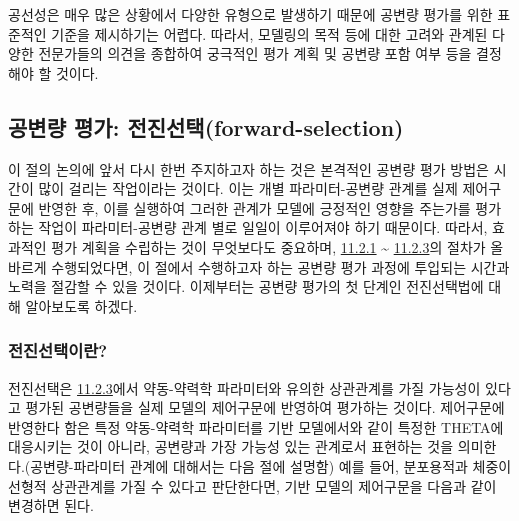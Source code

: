 \documentclass[
  11pt,
  krantz2,
  a4paper]{krantz}
\theoremstyle{definition}
\theoremstyle{definition}
\theoremstyle{definition}
\theoremstyle{remark}
\begin{document}
공선성은 매우 많은 상황에서 다양한 유형으로 발생하기 때문에 공변량 평가를 위한 표준적인 기준을 제시하기는 어렵다. 따라서, 모델링의 목적 등에 대한 고려와 관계된 다양한 전문가들의 의견을 종합하여 궁극적인 평가 계획 및 공변량 포함 여부 등을 결정해야 할 것이다.

\hypertarget{uxacf5uxbcc0uxb7c9-uxd3c9uxac00-uxc804uxc9c4uxc120uxd0ddforward-selection}{%
\subsection{공변량 평가: 전진선택(forward-selection)}\label{uxacf5uxbcc0uxb7c9-uxd3c9uxac00-uxc804uxc9c4uxc120uxd0ddforward-selection}}


이 절의 논의에 앞서 다시 한번 주지하고자 하는 것은 본격적인 공변량 평가 방법은 시간이 많이 걸리는 작업이라는 것이다. 이는 개별 파라미터-공변량 관계를 실제 제어구문에 반영한 후, 이를 실행하여 그러한 관계가 모델에 긍정적인 영향을 주는가를 평가하는 작업이 파라미터-공변량 관계 별로 일일이 이루어져야 하기 때문이다. 따라서, 효과적인 평가 계획을 수립하는 것이 무엇보다도 중요하며, \protect\hyperlink{variable-eval}{11.2.1} \textasciitilde{} \protect\hyperlink{colinearity}{11.2.3}의 절차가 올바르게 수행되었다면, 이 절에서 수행하고자 하는 공변량 평가 과정에 투입되는 시간과 노력을 절감할 수 있을 것이다. 이제부터는 공변량 평가의 첫 단계인 전진선택법에 대해 알아보도록 하겠다.

\hypertarget{forward-sel-def}{%
\subsubsection{전진선택이란?}\label{forward-sel-def}}


전진선택은 \protect\hyperlink{colinearity}{11.2.3}에서 약동-약력학 파라미터와 유의한 상관관계를 가질 가능성이 있다고 평가된 공변량들을 실제 모델의 제어구문에 반영하여 평가하는 것이다. 제어구문에 반영한다 함은 특정 약동-약력학 파라미터를 기반 모델에서와 같이 특정한 THETA에 대응시키는 것이 아니라, 공변량과 가장 가능성 있는 관계로서 표현하는 것을 의미한다.(공변량-파라미터 관계에 대해서는 다음 절에 설명함) 예를 들어, 분포용적과 체중이 선형적 상관관계를 가질 수 있다고 판단한다면, 기반 모델의 제어구문을 다음과 같이 변경하면 된다.
\end{document}

